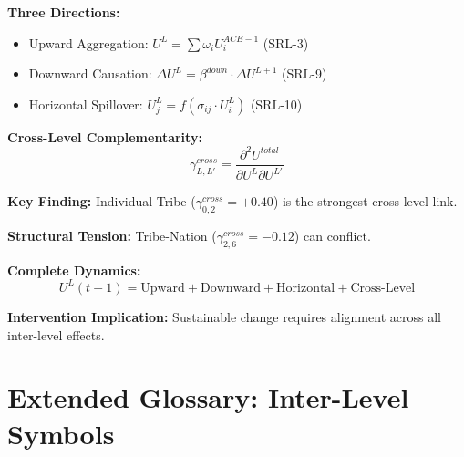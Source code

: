 \begin{tcolorbox}[colback=gray!5!white, colframe=gray!75!black, title=Inter-Level Dynamics Summary]

\textbf{Three Directions:}
\begin{itemize}
\item Upward Aggregation: $U^L = \sum \omega_i U^{ACE-1}_i$ (SRL-3)
\item Downward Causation: $\Delta U^L = \beta^{down} \cdot \Delta U^{L+1}$ (SRL-9)
\item Horizontal Spillover: $U^L_j = f(\sigma_{ij} \cdot U^L_i)$ (SRL-10)
\end{itemize}

\textbf{Cross-Level Complementarity:}
$$\gamma^{cross}_{L,L'} = \frac{\partial^2 U^{total}}{\partial U^L \partial U^{L'}}$$

\textbf{Key Finding:}
Individual-Tribe ($\gamma^{cross}_{0,2} = +0.40$) is the strongest cross-level link.

\textbf{Structural Tension:}
Tribe-Nation ($\gamma^{cross}_{2,6} = -0.12$) can conflict.

\textbf{Complete Dynamics:}
$$U^L(t+1) = \text{Upward} + \text{Downward} + \text{Horizontal} + \text{Cross-Level}$$

\textbf{Intervention Implication:}
Sustainable change requires alignment across all inter-level effects.

\end{tcolorbox}

\section{Extended Glossary: Inter-Level Symbols}
\label{sec:aaa-extended-glossary}

